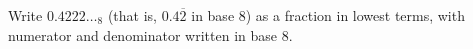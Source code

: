 Write $0.4222\ldots_8$ (that is, $0.4\overline{2}$ in base $8$) as a fraction in lowest terms, with numerator and denominator written in base $8$.
